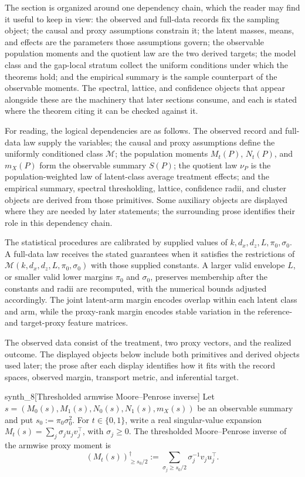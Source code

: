 \documentclass[11pt]{article}
\begin{document}
The section is organized around one dependency chain, which the reader may find it useful to keep in view: the observed and full-data records fix the sampling object; the causal and proxy assumptions constrain it; the latent masses, means, and effects are the parameters those assumptions govern; the observable population moments and the quotient law are the two derived targets; the model class and the gap-local stratum collect the uniform conditions under which the theorems hold; and the empirical summary is the sample counterpart of the observable moments. The spectral, lattice, and confidence objects that appear alongside these are the machinery that later sections consume, and each is stated where the theorem citing it can be checked against it.

For reading, the logical dependencies are as follows. The observed record and full-data law supply the variables; the causal and proxy assumptions define the uniformly conditioned class \(\mathcal M\); the population moments \(M_t(P)\), \(N_t(P)\), and \(m_X(P)\) form the observable summary \(S(P)\); the quotient law \(\nu_P\) is the population-weighted law of latent-class average treatment effects; and the empirical summary, spectral thresholding, lattice, confidence radii, and cluster objects are derived from those primitives. Some auxiliary objects are displayed where they are needed by later statements; the surrounding prose identifies their role in this dependency chain.

The statistical procedures are calibrated by supplied values of \(k,d_x,d_z,L,\pi_0,\sigma_0\). A full-data law receives the stated guarantees when it satisfies the restrictions of \(\mathcal M(k,d_x,d_z,L,\pi_0,\sigma_0)\) with those supplied constants. A larger valid envelope \(L\), or smaller valid lower margins \(\pi_0\) and \(\sigma_0\), preserves membership after the constants and radii are recomputed, with the numerical bounds adjusted accordingly. The joint latent-arm margin encodes overlap within each latent class and arm, while the proxy-rank margin encodes stable variation in the reference- and target-proxy feature matrices.

The observed data consist of the treatment, two proxy vectors, and the realized outcome. The displayed objects below include both primitives and derived objects used later; the prose after each display identifies how it fits with the record spaces, observed margin, transport metric, and inferential target.

\begin{definitionv}{synth_8}[Thresholded armwise Moore--Penrose inverse]
Let \(s=(M_0(s),M_1(s),N_0(s),N_1(s),m_X(s))\) be an observable summary and put \(s_0:=\pi_0\sigma_0^2\). For \(t\in\{0,1\}\), write a real singular-value expansion \(M_t(s)=\sum_j \sigma_j u_jv_j^\top\), with \(\sigma_j\ge0\). The thresholded Moore--Penrose inverse of the armwise proxy moment is\[ (M_t(s))^\dagger_{\ge s_0/2}:=\sum_{\sigma_j\ge s_0/2}\sigma_j^{-1}v_ju_j^\top.\]
\end{definitionv}
\end{document}
